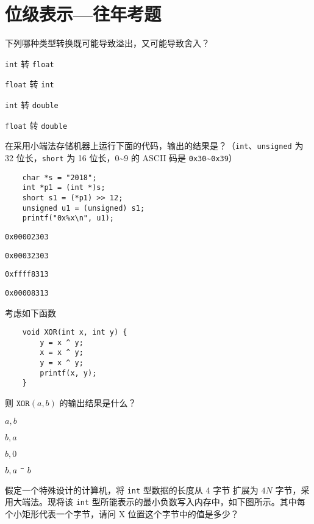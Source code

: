 \chapter{位级表示{---}往年考题}
	\begin{problems}
		 下列哪种类型转换既可能导致溢出，又可能导致舍入？
		\begin{choices}
			\item \texttt{int} 转 \texttt{float}
			\item \texttt{float} 转 \texttt{int}
			\item \texttt{int} 转 \texttt{double}
			\item \texttt{float} 转 \texttt{double}
		\end{choices}
		 在采用小端法存储机器上运行下面的代码，输出的结果是？（\texttt{int}、\texttt{unsigned} 为 32 位长，\texttt{short} 为 16 位长，0\textasciitilde9 的 ASCII 码是 \texttt{0x30}\textasciitilde\texttt{0x39}）
		\begin{verbatim}
    char *s = "2018";
    int *p1 = (int *)s;
    short s1 = (*p1) >> 12;
    unsigned u1 = (unsigned) s1;
    printf("0x%x\n", u1);
		\end{verbatim}
		\begin{choices}
			\item \texttt{0x00002303}
			\item \texttt{0x00032303}
			\item \texttt{0xffff8313}
			\item \texttt{0x00008313}
		\end{choices}
		 考虑如下函数
		\begin{verbatim}
    void XOR(int x, int y) {
        y = x ^ y;
        x = x ^ y;
        y = x ^ y;
        printf(x, y);
    }
		\end{verbatim}
		则 $\texttt{XOR}(a, b)$ 的输出结果是什么？
		\begin{choices}
			\item $a, b$
			\item $b, a$
			\item $b, 0$
			\item $b, a\ \verb|^|\ b$
		\end{choices}
		 假定一个特殊设计的计算机，将 \texttt{int} 型数据的长度从 4 字节 扩展为 $4N$ 字节，采用大端法。现将该 \texttt{int} 型所能表示的最小负数写入内存中，如下图所示。其中每个小矩形代表一个字节，请问 X 位置这个字节中的值是多少？
		\begin{figure}[H]

\end{figure}
\end{problems}
